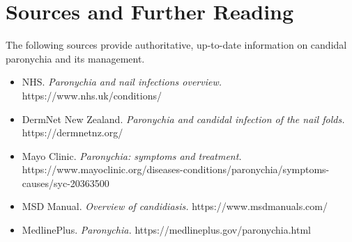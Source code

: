 \section*{Sources and Further Reading}
The following sources provide authoritative, up-to-date information on candidal paronychia and its management.
\begin{itemize}
    \item NHS. \textit{Paronychia and nail infections overview.} https://www.nhs.uk/conditions/
    \item DermNet New Zealand. \textit{Paronychia and candidal infection of the nail folds.} https://dermnetnz.org/
    \item Mayo Clinic. \textit{Paronychia: symptoms and treatment.} https://www.mayoclinic.org/diseases-conditions/paronychia/symptoms-causes/syc-20363500
    \item MSD Manual. \textit{Overview of candidiasis.} https://www.msdmanuals.com/
    \item MedlinePlus. \textit{Paronychia.} https://medlineplus.gov/paronychia.html
\end{itemize}
